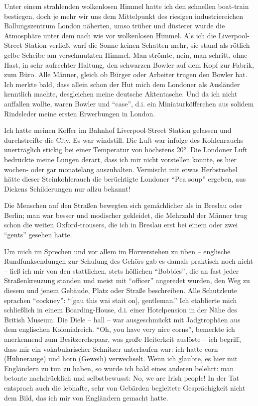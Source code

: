 Unter einem strahlenden wolkenlosen Himmel hatte ich den schnellen boat-train bestiegen, doch je mehr wir uns dem Mittelpunkt des riesigen industriereichen Ballungszentrum London näherten, umso trüber und düsterer wurde die Atmosphäre unter dem nach wie vor wolkenlosen Himmel. Als ich die Liverpool-Street-Station verließ, warf die Sonne keinen Schatten mehr, sie stand als rötlich-gelbe Scheibe am verschmutzten Himmel. Man strömte, nein, man schritt, ohne Hast, in sehr aufrechter Haltung, den schwarzen Bowler auf dem Kopf zur Fabrik, zum Büro. Alle Männer, gleich ob Bürger oder Arbeiter trugen den Bowler hat. Ich merkte bald, dass allein schon der Hut mich dem Londoner als Ausländer kenntlich machte, desgleichen meine deutsche Aktentasche. Und da ich nicht auffallen wollte, waren Bowler und \enquote{case}, d.i. ein Miniaturköfferchen aus solidem Rindsleder meine ersten Erwerbungen in London.

Ich hatte meinen Koffer im Bahnhof Liverpool-Street Station gelassen und durchstreifte die City. Es war windstill. Die Luft war infolge des Kohlenrauchs unerträglich stickig bei einer Temperatur von höchstens 20°. Die Londoner Luft bedrückte meine Lungen derart, dass ich mir nicht vorstellen konnte, es hier wochen- oder gar monatelang auszuhalten. Vermischt mit etwas Herbstnebel hätte dieser Steinkohlerauch die berüchtigte Londoner \enquote{Pea soup} ergeben, aus Dickens Schilderungen nur allzu bekannt!

Die Menschen auf den Straßen bewegten sich gemächlicher als in Breslau oder Berlin; man war besser und modischer gekleidet, die Mehrzahl der Männer trug schon die weiten Oxford-trousers, die ich in Breslau erst bei einem oder zwei \enquote{gents} gesehen hatte.

Um mich im Sprechen und vor allem im Hörverstehen zu üben -- englische Rundfunksendungen zur Schulung des Gehörs gab es damals praktisch noch nicht -- ließ ich mir von den stattlichen, stets höflichen \enquote{Bobbies}, die an fast jeder Straßenkreuzung standen und meist mit \enquote{officer} angeredet wurden, den Weg zu diesem und jenem Gebäude, Platz oder Straße beschreiben. Alle Schutzleute sprachen \enquote{cockney}: \enquote{[gau this wai stait on], gentleman.} Ich etablierte mich schließlich in einem Boarding-House, d.i. einer Hotelpension in der Nähe des British Museum. Die Diele -- hall -- war ausgeschmückt mit Jadgtrophäen aus dem englischen Kolonialreich. \enquote{Oh, you have very nice corns}, bemerkte ich anerkennend zum Besitzerehepaar, was große Heiterkeit auslöste -- ich begriff, dass mir ein vokabularischer Schnitzer unterlaufen war: ich hatte corn (Hühnerauge) und horn (Geweih) verwechselt. Wenn ich glaubte, es hier mit Engländern zu tun zu haben, so wurde ich bald eines anderen belehrt: man betonte nachdrücklich und selbstbewusst: No, we are Irish people! In der Tat entsprach auch die lebhafte, sehr von Gebärden begleitete Gesprächigkeit nicht dem Bild, das ich mir von Engländern gemacht hatte.

